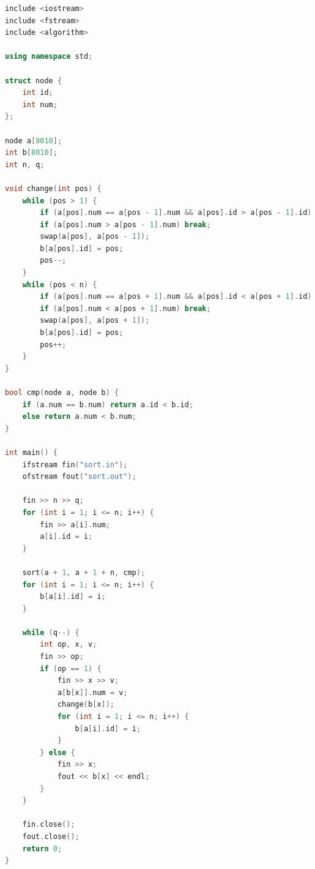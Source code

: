 \documentclass[12pt,twiside,a4paper]{ctexbook}
\numberwithin{chapter}{part}
\begin{document}
\begin{lstlisting}[language=C++,breaklines=true]
include <iostream>
include <fstream>
include <algorithm>

using namespace std;

struct node {
    int id;
    int num;
};

node a[8010];
int b[8010];
int n, q;

void change(int pos) {
    while (pos > 1) {
        if (a[pos].num == a[pos - 1].num && a[pos].id > a[pos - 1].id) break;
        if (a[pos].num > a[pos - 1].num) break;
        swap(a[pos], a[pos - 1]);
        b[a[pos].id] = pos;
        pos--;
    }
    while (pos < n) {
        if (a[pos].num == a[pos + 1].num && a[pos].id < a[pos + 1].id) break;
        if (a[pos].num < a[pos + 1].num) break;
        swap(a[pos], a[pos + 1]);
        b[a[pos].id] = pos;
        pos++;
    }
}

bool cmp(node a, node b) {
    if (a.num == b.num) return a.id < b.id;
    else return a.num < b.num;
}

int main() {
    ifstream fin("sort.in");
    ofstream fout("sort.out");

    fin >> n >> q;
    for (int i = 1; i <= n; i++) {
        fin >> a[i].num;
        a[i].id = i;
    }

    sort(a + 1, a + 1 + n, cmp);
    for (int i = 1; i <= n; i++) {
        b[a[i].id] = i;
    }

    while (q--) {
        int op, x, v;
        fin >> op;
        if (op == 1) {
            fin >> x >> v;
            a[b[x]].num = v;
            change(b[x]);
            for (int i = 1; i <= n; i++) {
                b[a[i].id] = i;
            }
        } else {
            fin >> x;
            fout << b[x] << endl;
        }
    }

    fin.close();
    fout.close();
    return 0;
}
\end{lstlisting}
\end{document}
